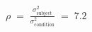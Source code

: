 \documentclass[border=10pt]{standalone}
\newcommand{\eqcol}{\color{sbnavy}}
\begin{document}
{\fontsize{26}{32}\selectfont \eqcol $\displaystyle \rho \;=\; \frac{\sigma^2_{\text{subject}}}{\sigma^2_{\text{condition}}} \;=\; 7.2$}
\end{document}
